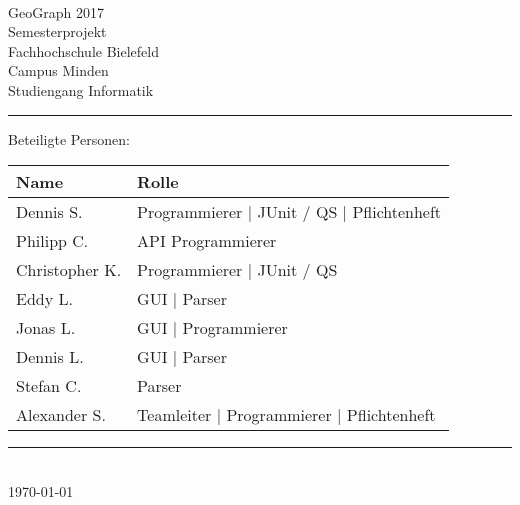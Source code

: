 


\begin{titlepage}
   \mbox{}\vspace{5\baselineskip}\\
   \sffamily\huge
   \centering
   {\Huge GeoGraph 2017} \\
   \normalsize Semesterprojekt
   \vspace{3\baselineskip}\\
   \rmfamily\Large
  Fachhochschule Bielefeld \\
  Campus Minden \\
  Studiengang Informatik
   \vspace{2\baselineskip}\\
\noindent\rule{15cm}{0.4pt}
Beteiligte Personen:
\begin{table}[H]
	\tablestyle
	\begin{tabular}{*{2}{v{0.45\textwidth}}}
		\hline
		\textbf{Name} &
		\textbf{Rolle} \tabularnewline
		\hline
		Dennis S.  & Programmierer | JUnit / QS | Pflichtenheft 	\tabularnewline
		Philipp C.  & API Programmierer 	\tabularnewline
		Christopher K. & Programmierer | JUnit / QS 	\tabularnewline
		Eddy L. & GUI | Parser			\tabularnewline
		Jonas L. & GUI | Programmierer				\tabularnewline
		Dennis L. & GUI | Parser  			\tabularnewline
		Stefan C. & Parser					\tabularnewline
		Alexander S. & Teamleiter | Programmierer | Pflichtenheft		\tabularnewline

	\end{tabular}
\end{table}

   \noindent\rule{15cm}{0.4pt}
      \vspace{1\baselineskip}\\
   \today
\end{titlepage}

